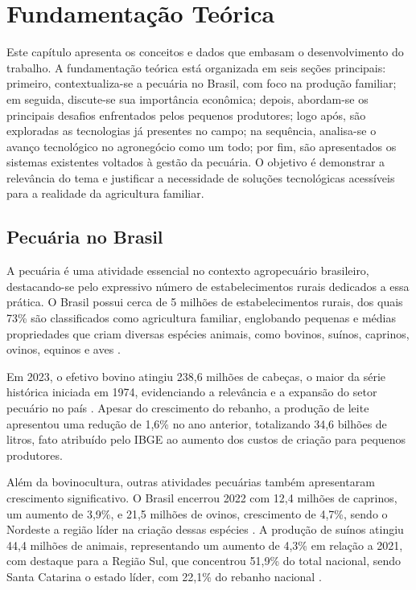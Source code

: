 \chapter{Fundamentação Teórica}
\label{cap:fundamentacao-teorica}

Este capítulo apresenta os conceitos e dados que embasam o desenvolvimento do trabalho. A fundamentação teórica está organizada em seis seções principais: primeiro, contextualiza-se a pecuária no Brasil, com foco na produção familiar; em seguida, discute-se sua importância econômica; depois, abordam-se os principais desafios enfrentados pelos pequenos produtores; logo após, são exploradas as tecnologias já presentes no campo; na sequência, analisa-se o avanço tecnológico no agronegócio como um todo; por fim, são apresentados os sistemas existentes voltados à gestão da pecuária. O objetivo é demonstrar a relevância do tema e justificar a necessidade de soluções tecnológicas acessíveis para a realidade da agricultura familiar.

\section{Pecuária no Brasil}
\label{sec:fundamentacao-teorica-pecuaria-no-brasil}

A pecuária é uma atividade essencial no contexto agropecuário brasileiro, destacando-se pelo expressivo número de estabelecimentos rurais dedicados a essa prática. O Brasil possui cerca de 5 milhões de estabelecimentos rurais, dos quais 73\% são classificados como agricultura familiar, englobando pequenas e médias propriedades que criam diversas espécies animais, como bovinos, suínos, caprinos, ovinos, equinos e aves \cite{centroAgro2017}.

Em 2023, o efetivo bovino atingiu 238,6 milhões de cabeças, o maior da série histórica iniciada em 1974, evidenciando a relevância e a expansão do setor pecuário no país \cite{agenciaBrasil2023}. Apesar do crescimento do rebanho, a produção de leite apresentou uma redução de 1,6\% no ano anterior, totalizando 34,6 bilhões de litros, fato atribuído pelo IBGE ao aumento dos custos de criação para pequenos produtores.

Além da bovinocultura, outras atividades pecuárias também apresentaram crescimento significativo. O Brasil encerrou 2022 com 12,4 milhões de caprinos, um aumento de 3,9\%, e 21,5 milhões de ovinos, crescimento de 4,7\%, sendo o Nordeste a região líder na criação dessas espécies \cite{agenciaBrasil2023}. A produção de suínos atingiu 44,4 milhões de animais, representando um aumento de 4,3\% em relação a 2021, com destaque para a Região Sul, que concentrou 51,9\% do total nacional, sendo Santa Catarina o estado líder, com 22,1\% do rebanho nacional \cite{agenciaBrasil2023}.

